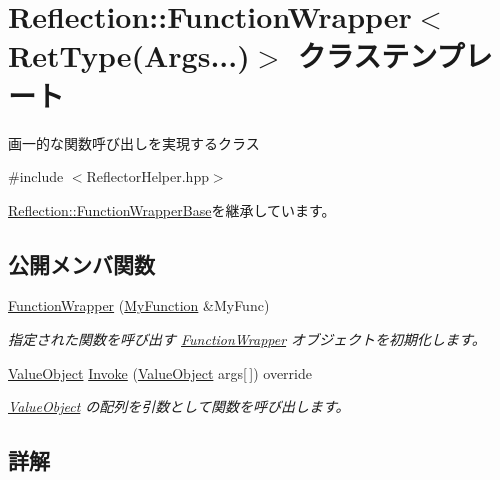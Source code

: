 \hypertarget{class_reflection_1_1_function_wrapper_3_01_ret_type_07_args_8_8_8_08_4}{}\section{Reflection\+:\+:Function\+Wrapper$<$ Ret\+Type(Args...)$>$ クラステンプレート}
\label{class_reflection_1_1_function_wrapper_3_01_ret_type_07_args_8_8_8_08_4}


画一的な関数呼び出しを実現するクラス 




{\ttfamily \#include $<$Reflector\+Helper.\+hpp$>$}



\hyperlink{class_reflection_1_1_function_wrapper_base}{Reflection\+::\+Function\+Wrapper\+Base}を継承しています。

\subsection*{公開メンバ関数}
\begin{DoxyCompactItemize}
\item 
\hyperlink{class_reflection_1_1_function_wrapper_3_01_ret_type_07_args_8_8_8_08_4_a4d94e5b31268e761b6f6afa34c652ec6}{Function\+Wrapper} (\hyperlink{classstd_1_1function}{My\+Function} \&My\+Func)
\begin{DoxyCompactList}\small\item\em 指定された関数を呼び出す \hyperlink{class_reflection_1_1_function_wrapper}{Function\+Wrapper} オブジェクトを初期化します。\end{DoxyCompactList}\item 
\hyperlink{struct_reflection_1_1_value_object}{Value\+Object} \hyperlink{class_reflection_1_1_function_wrapper_3_01_ret_type_07_args_8_8_8_08_4_a3b72d4bde1ce9f8712c802672c7c4790}{Invoke} (\hyperlink{struct_reflection_1_1_value_object}{Value\+Object} args\mbox{[}$\,$\mbox{]}) override
\begin{DoxyCompactList}\small\item\em \hyperlink{struct_reflection_1_1_value_object}{Value\+Object} の配列を引数として関数を呼び出します。\end{DoxyCompactList}\end{DoxyCompactItemize}


\subsection{詳解}
